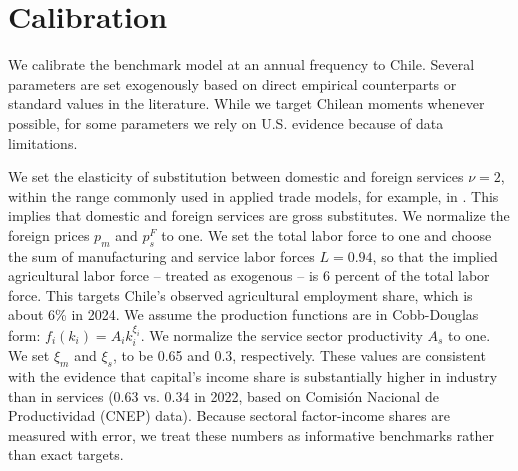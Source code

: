 \documentclass[12pt]{article} %
\theoremstyle{definition}
\begin{document}

\section{Calibration}\label{section calibration}
\color{black}

We calibrate the benchmark model at an annual frequency to Chile.  Several parameters are set exogenously based on direct empirical counterparts or standard values in the literature. While we target Chilean moments whenever possible, for some parameters we rely on  U.S. evidence because of  data limitations. 



We set the elasticity of substitution between  domestic  and foreign services $\nu=2$,  within the range commonly used in applied trade models, for example, in \cite{GTAP}. This implies that domestic and  foreign  services are gross substitutes. We normalize the foreign prices $p_m$ and $p_s^F$ to one. We set the total labor force to one and choose the sum of manufacturing and service labor forces $L=0.94$, so that the implied agricultural labor force -- treated as exogenous -- is 6 percent of the total labor force. This targets Chile's observed agricultural employment share, which is about 6\% in 2024.   We assume the production functions are in Cobb-Douglas form:  $f_i(k_i)=A_ik_i^{\xi_i}$. We normalize the service sector productivity  $A_s$ to one. We set  $\xi_m$ and $\xi_s$, to be 0.65 and 0.3, respectively. These values are consistent with the evidence that capital’s income share  is substantially higher in industry than in services (0.63 vs. 0.34 in 2022, based on Comisión Nacional de Productividad (CNEP) data). Because sectoral factor-income shares are measured with error, we treat these numbers as informative benchmarks  rather than exact targets.
\end{document}
